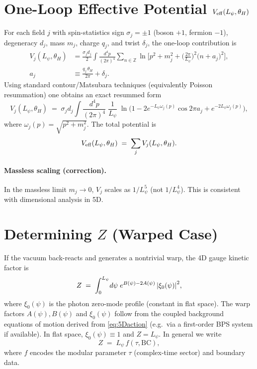 \documentclass[12pt]{article}
\begin{document}
\section{One-Loop Effective Potential $V_{\rm eff}(L_\psi,\theta_H)$}
For each field $j$ with spin-statistics sign $\sigma_j=\pm 1$ (boson $+1$, fermion $-1$), degeneracy $d_j$, mass $m_j$,
charge $q_j$, and twist $\delta_j$, the one-loop contribution is
\begin{align}
V_j(L_\psi,\theta_H)
&=\frac{\sigma_j d_j}{2}\int \!\frac{d^4p}{(2\pi)^4}\sum_{n\in\mathbb{Z}}
\ln\!\Big[p^2 + m_j^2 + \big(\tfrac{2\pi}{L_\psi}\big)^2\big(n+a_j\big)^2\Big],
\label{eq:Vsum}
\\
a_j &\equiv \frac{q_j\,\theta_H}{2\pi} + \delta_j.
\end{align}
Using standard contour/Matsubara techniques (equivalently Poisson resummation) one obtains an exact resummed form
\begin{equation}
\boxed{
V_j(L_\psi,\theta_H) \;=\; \sigma_j d_j \int \!\frac{d^4p}{(2\pi)^4}\; \frac{1}{L_\psi}\;
\ln\!\Big(1 - 2 e^{-L_\psi \omega_j(p)} \cos 2\pi a_j + e^{-2 L_\psi \omega_j(p)}\Big) ,
}
\label{eq:Veff-resummed}
\end{equation}
where $\omega_j(p)=\sqrt{p^2+m_j^2}$. The total potential is
\begin{equation}
V_{\rm eff}(L_\psi,\theta_H) \;=\; \sum_j V_j(L_\psi,\theta_H).
\end{equation}

\paragraph{Massless scaling (correction).}
In the massless limit $m_j\to 0$, $V_j$ scales as $1/L_\psi^{5}$ (not $1/L_\psi^4$). This is consistent with dimensional analysis in 5D.

\section{Determining $Z$ (Warped Case)}
If the vacuum back-reacts and generates a nontrivial warp, the 4D gauge kinetic factor is
\begin{equation}
Z \;=\; \int_0^{L_\psi}\! d\psi\; e^{B(\psi)-2A(\psi)}\, \abs{\xi_0(\psi)}^2,
\label{eq:Zwarp}
\end{equation}
where $\xi_0(\psi)$ is the photon zero-mode profile (constant in flat space).
The warp factors $A(\psi),B(\psi)$ and $\xi_0(\psi)$ follow from the coupled background equations of motion
derived from \eqref{eq:5Daction} (e.g.\ via a first-order BPS system if available).
In flat space, $\xi_0(\psi)\equiv 1$ and $Z=L_\psi$. In general we write
\begin{equation}
Z \;=\; L_\psi \, f(\tau,\mathrm{BC}) ,
\end{equation}
where $f$ encodes the modular parameter $\tau$ (complex-time sector) and boundary data.
\end{document}
